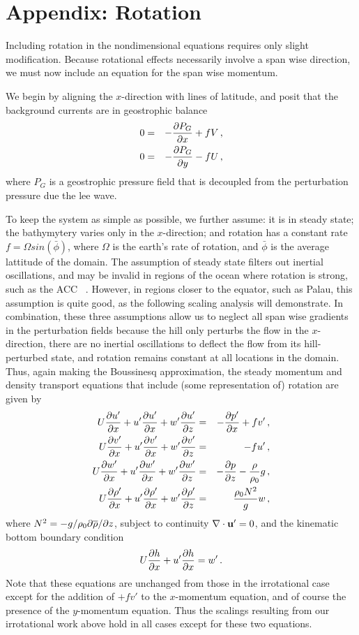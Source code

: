 \documentclass[12pt]{article}
\begin{document}
\section{Appendix: Rotation}
Including rotation in the nondimensional equations requires only slight modification. Because rotational effects necessarily involve a span wise direction, we must now include an equation for the span wise momentum. 

We begin by aligning the $x$-direction with lines of latitude, and posit that the background currents are in geostrophic balance
\begin{eqnarray*}
	0 &=& -\frac{\partial{P_G}}{\partial{x}} + fV \,,\\
	0 &=& -\frac{\partial{P_G}}{\partial{y}} - fU \,,\\
\end{eqnarray*}
where $P_G$ is a geostrophic pressure field that is decoupled from the perturbation pressure due the lee wave. 

To keep the system as simple as possible, we further assume: it is in steady state; the bathymytery varies only in the $x$-direction; and rotation has a constant rate $f=\Omega sin(\bar{\phi})$, where $\Omega$ is the earth's rate of rotation, and $\bar{\phi}$ is the average lattitude of the domain. The assumption of steady state filters out inertial oscillations, and may be invalid in regions of the ocean where rotation is strong, such as the ACC ~\citep{Nikurashin2010a}. However, in regions closer to the equator, such as Palau, this assumption is quite good, as the following scaling analysis will demonstrate.  In combination, these three assumptions allow us to neglect all span wise gradients in the perturbation fields because the hill only perturbs the flow in the $x$-direction, there are no inertial oscillations to deflect the flow from its hill-perturbed state, and rotation remains constant at all locations in the domain. Thus, again making the Boussinesq approximation, the steady momentum and density transport equations that include (some representation of) rotation are given by
\begin{eqnarray*}
	U \frac{\partial{u'}}{\partial{x}} +u' \frac{\partial{u'}}{\partial{x}} + w' \frac{\partial{u'}}{\partial{z}} &=& -\frac{\partial{p'}}{\partial{x}} + fv' \,,\\
	U \frac{\partial{v'}}{\partial{x}} + u' \frac{\partial{v'}}{\partial{x}} + w' \frac{\partial{v'}}{\partial{z}} &=& - fu' \,,\\
	U \frac{\partial{w'}}{\partial{x}} + u' \frac{\partial{w'}}{\partial{x}} + w' \frac{\partial{w'}}{\partial{z}} &=& -\frac{\partial{p}}{\partial{z}} - \frac{\rho}{\rho_0} g \,,\\
	U \frac{\partial{\rho'}}{\partial{x}} + u' \frac{\partial{\rho'}}{\partial{x}} + w' \frac{\partial{\rho'}}{\partial{z}} &=& \frac{\rho_0 N^2}{g} w\,,
\end{eqnarray*}
where $N^2 = -g/\rho_0 \partial\overline{\rho}/\partial z$, subject to continuity $\nabla\cdot\mathbf{u}'=0$, and
the kinematic bottom boundary condition
\[
U\frac{\partial{h}}{\partial{x}} + u' \frac{\partial{h}}{\partial{x}} = w'\,.
\]  
Note that these equations are unchanged from those in the irrotational case except for the addition of $+fv'$ to the $x$-momentum equation, and of course the presence of the $y$-momentum equation. Thus the scalings resulting from our irrotational work above hold in all cases except for these two equations. 
\end{document}
